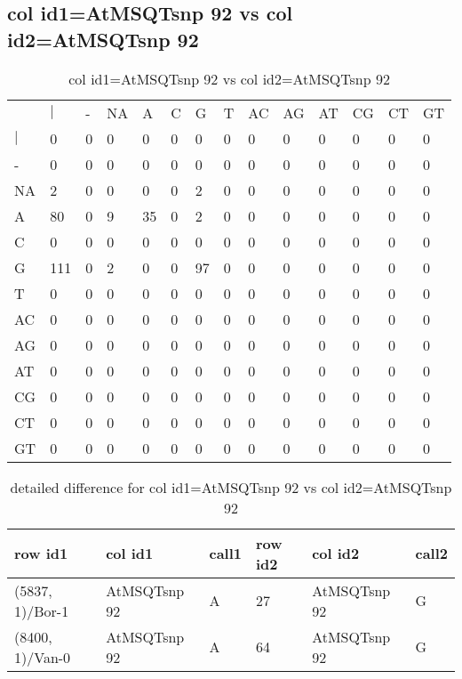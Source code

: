 \subsection{col id1=AtMSQTsnp 92 vs col id2=AtMSQTsnp 92}
\begin{center}
\begin{longtable}{|l|l|l|l|l|l|l|l|l|l|l|l|l|l|}
\caption{col id1=AtMSQTsnp 92 vs col id2=AtMSQTsnp 92} \label{table_dm976}\\
\hline
\\
\hline
&$|$&-&NA&A&C&G&T&AC&AG&AT&CG&CT&GT\\
$|$&0&0&0&0&0&0&0&0&0&0&0&0&0\\
-&0&0&0&0&0&0&0&0&0&0&0&0&0\\
NA&2&0&0&0&0&2&0&0&0&0&0&0&0\\
A&80&0&9&35&0&2&0&0&0&0&0&0&0\\
C&0&0&0&0&0&0&0&0&0&0&0&0&0\\
G&111&0&2&0&0&97&0&0&0&0&0&0&0\\
T&0&0&0&0&0&0&0&0&0&0&0&0&0\\
AC&0&0&0&0&0&0&0&0&0&0&0&0&0\\
AG&0&0&0&0&0&0&0&0&0&0&0&0&0\\
AT&0&0&0&0&0&0&0&0&0&0&0&0&0\\
CG&0&0&0&0&0&0&0&0&0&0&0&0&0\\
CT&0&0&0&0&0&0&0&0&0&0&0&0&0\\
GT&0&0&0&0&0&0&0&0&0&0&0&0&0\\
\hline
\end{longtable}
\end{center}

\begin{center}
\begin{longtable}{|l|l|l|l|l|l|}
\caption{detailed difference for col id1=AtMSQTsnp 92 vs col id2=AtMSQTsnp 92} \label{table_dm977}\\
\hline
row id1&col id1&call1&row id2&col id2&call2\\
\hline
(5837, 1)/Bor-1&AtMSQTsnp 92&A&27&AtMSQTsnp 92&G\\
(8400, 1)/Van-0&AtMSQTsnp 92&A&64&AtMSQTsnp 92&G\\
\hline
\end{longtable}
\end{center}

